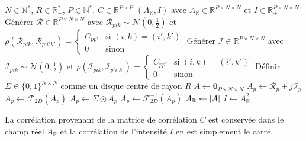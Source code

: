 \documentclass[MSc,french]{ulthese}
\begin{document}
\begin{algorithm}
\caption{Simulation temporelle de tavelures pleinement développées}\label{alg:specklesBaseTS}
\begin{algorithmic}
\Require $N\in\mathbb{N}^*$, $R\in\mathbb{R}_{+}^*$, $P\in\mathbb{N}^*$, $C\in\mathbb{R}^{P\times P}$
\Ensure $(A_\mathbb{R}, I)$ avec $A_\mathbb{R} \in \mathbb{R}^{P\times N\times N}$ et $I \in \mathbb{R}_+^{P \times N\times N}$
\State Générer $\mathcal{R} \in \mathbb{R}^{P \times N \times N}$ avec $\mathcal{R}_{pik} \sim \mathcal{N}\left(0, \frac{1}{2}\right)$ et $\rho\left(\mathcal{R}_{pik}, \mathcal{R}_{p'i'k'}\right) = \begin{cases}
C_{pp'} & \text{si }(i, k) = (i', k')\\
0 & \text{sinon}
\end{cases}$
\State Générer $\mathcal{I} \in \mathbb{R}^{P\times N\times N}$ avec $\mathcal{I}_{pik} \sim \mathcal{N}\left(0, \frac{1}{2}\right)$ et $\rho\left(\mathcal{I}_{pik}, \mathcal{I}_{p'i'k'}\right) = \begin{cases}
C_{pp'} & \text{si }(i, k) = (i', k')\\
0 & \text{sinon}
\end{cases}$
\State Définir $\Sigma \in \{0, 1\}^{N\times N}$ comme un disque centré de rayon $R$
\State $A\gets \textbf{0}_{P\times N \times N}$
\State $A_p \gets \mathcal{R}_p + j\mathcal{I}_p$
\State $A_p \gets \mathcal{F}_{2D}(A_p)$
\State $A_p \gets \Sigma \odot A_p$
\State $A_p \gets \mathcal{F}_{2D}^{-1}(A_p)$
\EndFor
\State $A_{\mathbb{R}} \gets \abs{A}$
\State $I \gets A_{\mathbb{R}}^2$
\end{algorithmic}
\end{algorithm}
La corrélation provenant de la matrice de corrélation $C$ est conservée dans le champ réel $A_\mathbb{R}$ et la corrélation de l'intensité $I$ en est simplement le carré. 
\end{document}
